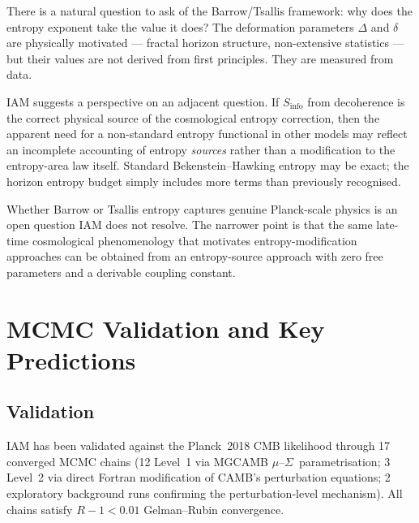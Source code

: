 \documentclass[12pt]{article}
\newcommand{\Sinfo}{S_\mathrm{info}}
\newcommand{\musig}{$\mu$--$\Sigma$}
\begin{document}
There is a natural question to ask of the Barrow/Tsallis framework: why does the
entropy exponent take the value it does?  The deformation parameters $\Delta$ and
$\delta$ are physically motivated --- fractal horizon structure, non-extensive
statistics --- but their values are not derived from first principles.  They are
measured from data.

IAM suggests a perspective on an adjacent question.  If $\Sinfo$ from decoherence
is the correct physical source of the cosmological entropy correction, then the
apparent need for a non-standard entropy functional in other models may reflect an
incomplete accounting of entropy \emph{sources} rather than a modification to the
entropy-area law itself.  Standard Bekenstein--Hawking entropy may be exact; the
horizon entropy budget simply includes more terms than previously recognised.

Whether Barrow or Tsallis entropy captures genuine Planck-scale physics is an
open question IAM does not resolve.  The narrower point is that the same late-time
cosmological phenomenology that motivates entropy-modification approaches can be
obtained from an entropy-source approach with zero free parameters and a derivable
coupling constant.

\section{MCMC Validation and Key Predictions}

\subsection{Validation}

IAM has been validated against the Planck~2018 CMB likelihood through 17 converged
MCMC chains (12 Level~1 via MGCAMB \musig\ parametrisation; 3 Level~2 via direct
Fortran modification of CAMB's perturbation equations; 2 exploratory background
runs confirming the perturbation-level mechanism).  All chains satisfy
$R-1 < 0.01$ Gelman--Rubin convergence.
\end{document}
